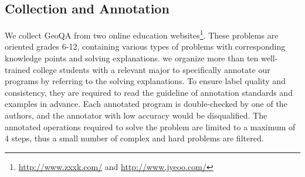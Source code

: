 \documentclass[11pt,a4paper]{article}
\begin{document}
\begin{table}[tbp]
\centering
{}
\caption{An overview of 18 operations of four different types and 7 constants in the defined program set.
}
\label{table-program}
\end{table}

\subsection{Collection and Annotation}
We collect GeoQA from two online education websites\footnote{\href{http://www.zxxk.com/}{http://www.zxxk.com/} and   \href{http://www.jyeoo.com/}{http://www.jyeoo.com/}}. These problems are oriented grades 6-12, containing various types of problems with corresponding knowledge points and solving explanations. 
we organize more than ten well-trained college students with a relevant major to specifically annotate our programs by referring to the solving explanations. To ensure label quality and consistency, they are required to read the guideline of annotation standards and examples in advance. Each annotated program is double-checked by one of the authors, and the annotator with low accuracy would be disqualified. 
The annotated operations required to solve the problem are limited to a maximum of 4 steps, thus a small number of complex and hard problems are filtered.
\end{document}
